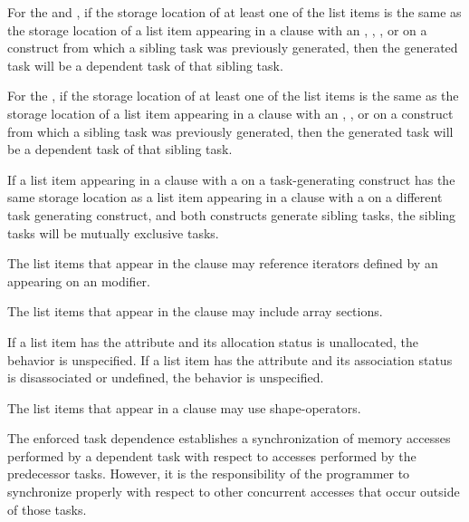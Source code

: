 For the  and  , if the storage 
location of at least one of the list items is the same as the storage location 
of a list item appearing in a  clause with an , , 
, or   on a construct from 
which a sibling task was previously generated, then the generated task will be 
a dependent task of that sibling task.

For the  , if the storage location of 
at least one of the list items is the same as the storage location of a list 
item appearing in a  clause with an , , or 
  on a construct from which a sibling task 
was previously generated, then the generated task will be a dependent task 
of that sibling task.

If a list item appearing in a  clause with a 
 on a task-generating construct has the same storage location as
a list item appearing in a  clause with a 
 on a different task generating construct, and both constructs
generate sibling tasks, the sibling tasks will be mutually exclusive tasks.

The list items that appear in the  clause may reference iterators
defined by an  appearing on an  modifier.

The list items that appear in the  clause may include array sections.

\begin{fortranspecific}
If a list item has the  attribute and its allocation
status is unallocated, the behavior is unspecified. If a list item has
the  attribute and its association status is
disassociated or undefined, the behavior is unspecified.
\end{fortranspecific}

\begin{ccppspecific}
The list items that appear in a  clause may use shape-operators.
\end{ccppspecific}

\begin{note}
The enforced task dependence establishes a synchronization of memory
accesses performed by a dependent task with respect to accesses performed by the
predecessor tasks. However, it is the responsibility of the programmer to synchronize properly with respect to other concurrent accesses that occur outside of those tasks.
\end{note}


